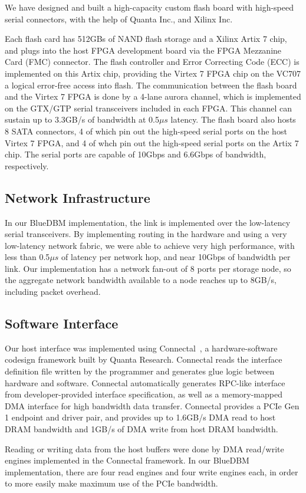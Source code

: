 We have designed and built a high-capacity custom flash board with high-speed
serial connectors, with the help of Quanta Inc., and Xilinx Inc.

Each flash card has 512GBs of NAND flash storage and a Xilinx Artix 7 chip, and
plugs into the host FPGA development board via the FPGA Mezzanine Card (FMC)
connector. The flash controller and Error Correcting Code (ECC) is implemented
on this Artix chip, providing the Virtex 7 FPGA chip on the VC707 a logical
error-free access into flash. The communication between the flash board and the
Virtex 7 FPGA is done by a 4-lane aurora channel, which is implemented on the
GTX/GTP serial transceivers included in each FPGA. This channel can sustain up
to 3.3GB/s of bandwidth at 0.5$\mu s$ latency.
The flash board also hosts 8 SATA connectors, 4 of
which pin out the high-speed serial ports on the host Virtex 7 FPGA,
and 4 of whch pin out the high-speed serial ports on the Artix 7 chip.
The serial ports are capable of 10Gbps and 6.6Gbps of bandwidth, respectively.

\subsection{Network Infrastructure}

In our BlueDBM implementation, the link is implemented over the
low-latency serial transceivers.  By
implementing routing in the hardware and using a very low-latency network
fabric, we were able to achieve very high performance, with less than 0.5$\mu s$ of
latency per network hop, and near 10Gbps of bandwidth per link. Our
implementation has a network fan-out of 8 ports per storage node, so the
aggregate network bandwidth available to a node reaches up to 8GB/s, including
packet overhead.

\subsection{Software Interface}

Our host interface was implemented using Connectal~\cite{connectal}, a
hardware-software codesign framework built by Quanta Research.
Connectal reads the interface definition file written by the programmer and
generates glue logic between hardware and software. Connectal automatically
generates RPC-like interface from developer-provided interface specification, as
well as a memory-mapped DMA interface for high bandwidth data transfer.
Connectal provides a PCIe Gen 1 endpoint and driver pair, and provides up to
1.6GB/s DMA read to host DRAM bandwidth and 1GB/s of DMA write from host DRAM
bandwidth. 

Reading or writing data from the host buffers were done by DMA read/write
engines implemented in the Connectal framework. In our BlueDBM
implementation, there are four read engines and four write engines each, in
order to more easily make maximum use of the PCIe bandwidth. 



